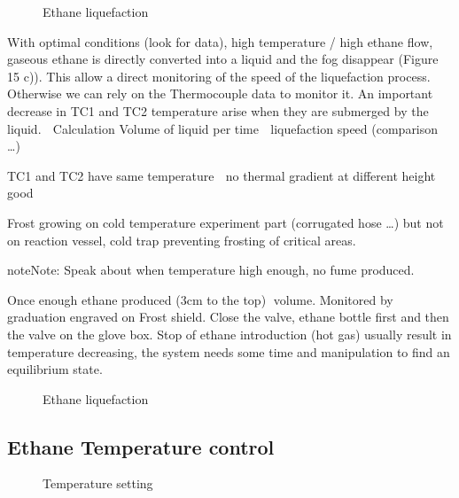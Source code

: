 \documentclass[letterpaper,10pt,english]{jupyterBook}
\begin{document}
\begin{figure}[htbp]
\centering
\capstart

\noindent{}
\caption{Ethane liquefaction}\label{\detokenize{Chapter7/Chapter7:id7}}\end{figure}

\sphinxAtStartPar
With optimal conditions (look for data), high temperature / high ethane flow, gaseous ethane is directly converted into a liquid and the fog disappear (Figure 15 c)). This allow a direct monitoring of the speed of the liquefaction process. Otherwise we can rely on the Thermocouple data to monitor it. An important decrease in TC1 and TC2 temperature arise when they are submerged by the liquid.
	Calculation Volume of liquid per time  liquefaction speed (comparison …)

\sphinxAtStartPar
TC1 and TC2 have same temperature  no thermal gradient at different height  good

\sphinxAtStartPar
Frost growing on cold temperature experiment part (corrugated hose …) but not on reaction vessel, cold trap preventing frosting of critical areas.

\begin{sphinxadmonition}{note}{Note:}
\sphinxAtStartPar
Speak about when temperature high enough, no fume produced.
\end{sphinxadmonition}

\sphinxAtStartPar
Once enough ethane produced (3cm to the top) volume. Monitored by graduation engraved on Frost shield. Close the valve, ethane bottle first and then the valve on the glove box.
Stop of ethane introduction (hot gas) usually result in temperature decreasing, the system needs some time and manipulation to find an equilibrium state.

\begin{figure}[htbp]
\centering
\capstart

\noindent{}
\caption{Ethane liquefaction}\label{\detokenize{Chapter7/Chapter7:id8}}\end{figure}


\subsection{Ethane Temperature control}
\label{\detokenize{Chapter7/Chapter7:ethane-temperature-control}}
\begin{figure}[htbp]
\centering
\capstart

\noindent{}
\caption{Temperature setting}\label{\detokenize{Chapter7/Chapter7:id9}}\end{figure}
\end{document}
